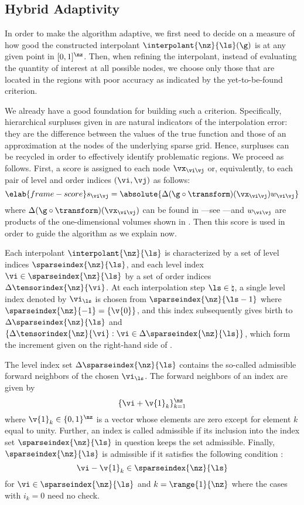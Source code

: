 \subsection{Hybrid Adaptivity}

In order to make the algorithm adaptive, we first need to decide on a measure of
how good the constructed interpolant $\interpolant{\nz}{\ls}(\g)$ is at any
given point in $[0, 1]^\nz$. Then, when refining the interpolant, instead of
evaluating the quantity of interest at all possible nodes, we choose only those
that are located in the regions with poor accuracy as indicated by the
yet-to-be-found criterion.

We already have a good foundation for building such a criterion. Specifically,
hierarchical surpluses given in  are natural
indicators of the interpolation error: they are the difference between the
values of the true function and those of an approximation at the nodes of the
underlying sparse grid. Hence, surpluses can be recycled in order to effectively
identify problematic regions. We proceed as follows. First, a score is assigned
to each node $\vx_{\vi \vj}$ or, equivalently, to each pair of level and order
indices $(\vi, \vj)$ as follows:
\begin{equation} \elab{frame-score}
  s_{\vi \vj} = \absolute{\Delta(\g \circ \transform)(\vx_{\vi \vj}) w_{\vi \vj}}
\end{equation}
where $\Delta(\g \circ \transform)(\vx_{\vi \vj})$ can be found in
---see ---and
$w_{\vi \vj}$ are products of the one-dimensional volumes shown in
. Then this score is used in order to guide the algorithm as
we explain now.

Each interpolant $\interpolant{\nz}{\ls}$ is characterized by a set of level
indices $\sparseindex{\nz}{\ls}$, and each level index $\vi \in
\sparseindex{\nz}{\ls}$ by a set of order indices
$\Delta\tensorindex{\nz}{\vi}$. At each interpolation step $\ls \in \natural$, a
single level index denoted by $\vi_{\ls}$ is chosen from $\sparseindex{\nz}{\ls
- 1}$ where $\sparseindex{\nz}{-1} = \{ \v{0} \}$, and this index subsequently
gives birth to $\Delta\sparseindex{\nz}{\ls}$ and $\{
\Delta\tensorindex{\nz}{\vi}: \vi \in \Delta\sparseindex{\nz}{\ls} \}$, which
form the increment given on the right-hand side of .

The level index set $\Delta\sparseindex{\nz}{\ls}$ contains the so-called
admissible forward neighbors of the chosen $\vi_{\ls}$. The forward neighbors of
an index \vi are given by
\[
  \{ \vi + \v{1}_k \}_{k = 1}^\nz
\]
where $\v{1}_k \in \{ 0, 1 \}^\nz$ is a vector whose elements are zero except
for element $k$ equal to unity. Further, an index \vi is called admissible if
its inclusion into the index set $\sparseindex{\nz}{\ls}$ in question keeps the
set admissible. Finally, $\sparseindex{\nz}{\ls}$ is admissible if it satisfies
the following condition \cite{klimke2006}:
\[
  \vi - \v{1}_k \in \sparseindex{\nz}{\ls}
\]
for $\vi \in \sparseindex{\nz}{\ls}$ and $k = \range{1}{\nz}$ where the cases
with $i_k = 0$ need no check.


